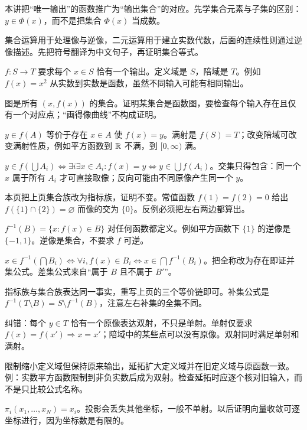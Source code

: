 
本讲把“唯一输出”的函数推广为“输出集合”的对应。先学集合元素与子集的区别：$y\in\Phi(x)$，而不是把集合 $\Phi(x)$ 当成数。

集合运算用于处理像与逆像，二元运算用于建立实数代数，后面的连续性则通过逆像描述。先把符号翻译为中文句子，再证明集合等式。

$f:S\to T$ 要求每个 $x\in S$ 恰有一个输出。定义域是 $S$，陪域是 $T$。例如 $f(x)=x^2$ 从实数到实数是函数，虽然不同输入可能有相同输出。

图是所有 $(x,f(x))$ 的集合。证明某集合是函数图，要检查每个输入存在且仅有一个对应点；“画得像曲线”不构成证明。

$y\in f(A)$ 等价于存在 $x\in A$ 使 $f(x)=y$。满射是 $f(S)=T$；改变陪域可改变满射性质，例如平方函数到 $\mathbb{R}$ 不满，到 $[0,\infty)$ 满。

$y\in f(\bigcup A_i)\iff\exists i\exists x\in A_i:f(x)=y\iff y\in\bigcup f(A_i)$。交集只得包含：同一个 $x$ 属于所有 $A_i$ 才可直接取像；反向可能由不同原像产生同一个 $y$。

本页把上页集合族改为指标族，证明不变。常值函数 $f(1)=f(2)=0$ 给出 $f(\{1\}\cap\{2\})=\varnothing$ 而像的交为 $\{0\}$。反例必须把左右两边都算出。

$f^{-1}(B)=\{x:f(x)\in B\}$ 对任何函数都定义。例如平方函数下 $\{1\}$ 的逆像是 $\{-1,1\}$。逆像是集合，不要求 $f$ 可逆。

$x\in f^{-1}(\bigcap B_i)\iff\forall i,f(x)\in B_i\iff x\in\bigcap f^{-1}(B_i)$。把全称改为存在即证并集公式。差集公式来自“属于 $B$ 且不属于 $B'$”。

指标族与集合族表达同一事实，重写上页的三个等价链即可。补集公式是 $f^{-1}(T\setminus B)=S\setminus f^{-1}(B)$，注意左右补集的全集不同。

纠错：每个 $y\in T$ 恰有一个原像表达双射，不只是单射。单射仅要求 $f(x)=f(x')\Rightarrow x=x'$；陪域中的某些点可以没有原像。双射同时满足单射和满射。

限制缩小定义域但保持原来输出，延拓扩大定义域并在旧定义域与原函数一致。例：实数平方函数限制到非负实数后成为双射。检查延拓时应逐个核对旧输入，而不是只比较公式名称。

$\pi_i(x_1,\ldots,x_N)=x_i$。投影会丢失其他坐标，一般不单射。以后证明向量收敛可逐坐标进行，因为坐标数是有限的。

